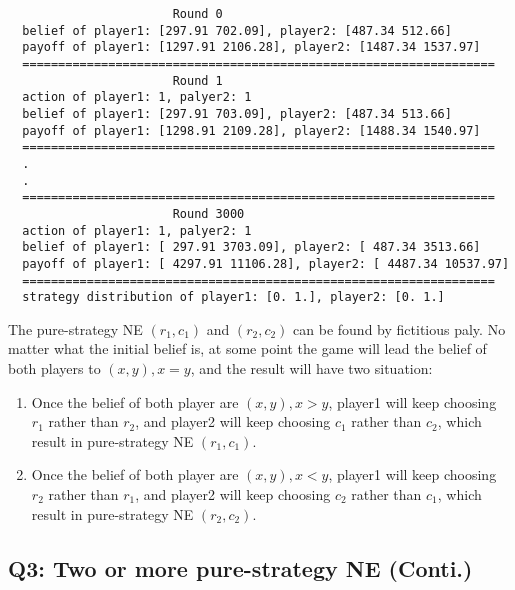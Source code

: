 \documentclass[a4paper, oneside, final, 12pt]{scrartcl} %
\begin{document}
\newpage

\begin{lstlisting}
                       Round 0
  belief of player1: [297.91 702.09], player2: [487.34 512.66]
  payoff of player1: [1297.91 2106.28], player2: [1487.34 1537.97]
  ==================================================================
                       Round 1
  action of player1: 1, palyer2: 1
  belief of player1: [297.91 703.09], player2: [487.34 513.66]
  payoff of player1: [1298.91 2109.28], player2: [1488.34 1540.97]
  ==================================================================
  .
  .
  ==================================================================
                       Round 3000
  action of player1: 1, palyer2: 1
  belief of player1: [ 297.91 3703.09], player2: [ 487.34 3513.66]
  payoff of player1: [ 4297.91 11106.28], player2: [ 4487.34 10537.97]
  ==================================================================
  strategy distribution of player1: [0. 1.], player2: [0. 1.]
\end{lstlisting}

\begingroup
\raggedright
The pure-strategy NE $(r_1, c_1)$ and $(r_2, c_2)$ can be found by fictitious paly.
No matter what the initial belief is, 
at some point the game will lead the belief of both players to $(x, y), x=y$,
and the result will have two situation:
\begin{enumerate}
  \item Once the belief of both player are $(x, y), x > y$, 
  player1 will keep choosing $r_1$ rather than $r_2$, 
  and player2 will keep choosing $c_1$ rather than $c_2$, 
  which result in pure-strategy NE $(r_1, c_1)$.
  \item Once the belief of both player are $(x, y), x < y$, 
  player1 will keep choosing $r_2$ rather than $r_1$, 
  and player2 will keep choosing $c_2$ rather than $c_1$, 
  which result in pure-strategy NE $(r_2, c_2)$.
\end{enumerate}

\endgroup

\subsection{Q3: Two or more pure-strategy NE (Conti.)}
\end{document}
